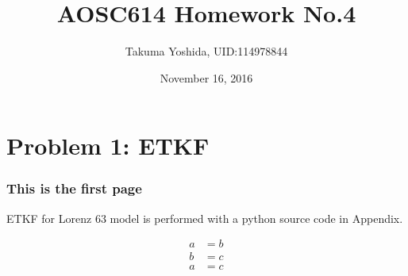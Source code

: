 \documentclass{beamer}
\title{AOSC614 Homework No.4}
\date{November 16, 2016}
\author{Takuma Yoshida, UID:114978844}
\begin{document}
\maketitle

\section*{Problem 1: ETKF}
\begin{frame}
\frametitle{This is the first page}
ETKF for Lorenz 63 model is performed with a python source code in Appendix.

\begin{align}
a &= b \\
b &= c \\
a &= c
\end{align}
\end{frame}
\end{document}
